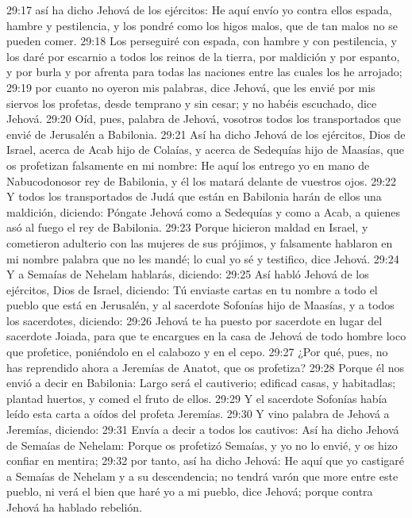 29:17 así ha dicho Jehová de los ejércitos: He aquí envío yo contra ellos espada, hambre y pestilencia, y los pondré como los higos malos, que de tan malos no se pueden comer.  
29:18 Los perseguiré con espada, con hambre y con pestilencia, y los daré por escarnio a todos los reinos de la tierra, por maldición y por espanto, y por burla y por afrenta para todas las naciones entre las cuales los he arrojado;  
29:19 por cuanto no oyeron mis palabras, dice Jehová, que les envié por mis siervos los profetas, desde temprano y sin cesar; y no habéis escuchado, dice Jehová.  
29:20 Oíd, pues, palabra de Jehová, vosotros todos los transportados que envié de Jerusalén a Babilonia.  
29:21 Así ha dicho Jehová de los ejércitos, Dios de Israel, acerca de Acab hijo de Colaías, y acerca de Sedequías hijo de Maasías, que os profetizan falsamente en mi nombre: He aquí los entrego yo en mano de Nabucodonosor rey de Babilonia, y él los matará delante de vuestros ojos.  
29:22 Y todos los transportados de Judá que están en Babilonia harán de ellos una maldición, diciendo: Póngate Jehová como a Sedequías y como a Acab, a quienes asó al fuego el rey de Babilonia.  
29:23 Porque hicieron maldad en Israel, y cometieron adulterio con las mujeres de sus prójimos, y falsamente hablaron en mi nombre palabra que no les mandé; lo cual yo sé y testifico, dice Jehová.  
29:24 Y a Semaías de Nehelam hablarás, diciendo:  
29:25 Así habló Jehová de los ejércitos, Dios de Israel, diciendo: Tú enviaste cartas en tu nombre a todo el pueblo que está en Jerusalén, y al sacerdote Sofonías hijo de Maasías, y a todos los sacerdotes, diciendo:  
29:26 Jehová te ha puesto por sacerdote en lugar del sacerdote Joiada, para que te encargues en la casa de Jehová de todo hombre loco que profetice, poniéndolo en el calabozo y en el cepo.  
29:27 ¿Por qué, pues, no has reprendido ahora a Jeremías de Anatot, que os profetiza?  
29:28 Porque él nos envió a decir en Babilonia: Largo será el cautiverio; edificad casas, y habitadlas; plantad huertos, y comed el fruto de ellos.  
29:29 Y el sacerdote Sofonías había leído esta carta a oídos del profeta Jeremías.  
29:30 Y vino palabra de Jehová a Jeremías, diciendo:  
29:31 Envía a decir a todos los cautivos: Así ha dicho Jehová de Semaías de Nehelam: Porque os profetizó Semaías, y yo no lo envié, y os hizo confiar en mentira;  
29:32 por tanto, así ha dicho Jehová: He aquí que yo castigaré a Semaías de Nehelam y a su descendencia; no tendrá varón que more entre este pueblo, ni verá el bien que haré yo a mi pueblo, dice Jehová; porque contra Jehová ha hablado rebelión.  

